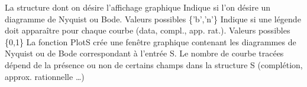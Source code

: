 %
%
%
%
%
%
%
%
%
{}%
{
\fitem[S] La structure dont on d\'esire l'affichage graphique
\fitem[g\_t=DVC.PS.graphic\_type\_flag] Indique si l'on d\'esire un
diagramme de Nyquist ou Bode. Valeurs possibles \{'b','n'\}
\fitem[l\_f=DVC.PS.legend\_flag] Indique si une l\'egende doit appara\^itre 
pour chaque courbe (data, compl., app. rat.). Valeurs possibles \{0,1\}
}
{}
{La fonction PlotS cr\'ee une fen\^etre graphique contenant les
diagrammes de Nyquist ou de Bode correspondant \`a l'entr\'ee S. Le
nombre de courbe trac\'ees d\'epend de la pr\'esence ou non de certains
champs dans la structure S (compl\'etion, approx. rationnelle \dots ) 
} 

